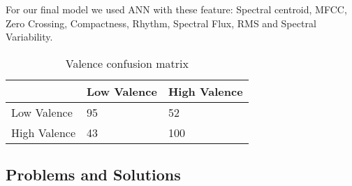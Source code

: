 For our final model we used ANN with these feature: Spectral centroid, MFCC, Zero Crossing, Compactness, Rhythm, Spectral Flux, RMS and Spectral Variability.

\begin{table}[h!]
        \caption{Valence confusion matrix}
        \begin{center}
                \begin{tabular}{|l|l|l|}
                        \hline

                        &
                        Low Valence
                        &
                        High Valence
                        \\\hline

                        Low Valence
                        &
                        95
                        &
                        52
                        \\\hline

                        High Valence
                        &
                        43
                        &
                        100
                        \\\hline

                \end{tabular}
        \end{center}
\end{table}

\subsection{Problems and Solutions}
